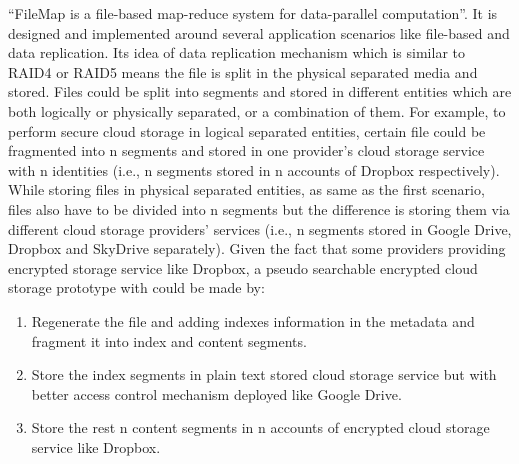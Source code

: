 “FileMap is a file-based map-reduce system for data-parallel computation”\cite{Mfisk2013}. It is designed and implemented around several application scenarios like file-based and data replication. Its idea of data replication mechanism which is similar to RAID4 or RAID5 means the file is split in the physical separated media and stored. Files could be split into segments and stored in different entities which are both logically or physically separated, or a combination of them. For example, to perform secure cloud storage in logical separated entities, certain file could be fragmented into n segments and stored in one provider’s cloud storage service with n identities (i.e., n segments stored in n accounts of Dropbox respectively). While storing files in physical separated entities, as same as the first scenario, files also have to be divided into n segments but the difference is storing them via different cloud storage providers’ services (i.e., n segments stored in Google Drive, Dropbox and SkyDrive separately). Given the fact that some providers providing encrypted storage service like Dropbox, a pseudo searchable encrypted cloud storage prototype with could be made by:
\begin{enumerate}
  \item 
  Regenerate the file and adding indexes information in the metadata and fragment it into index and content segments.
  \item 
  Store the index segments in plain text stored cloud storage service but with better access control mechanism deployed like Google Drive.
  \item
  Store the rest n content segments in n accounts of encrypted cloud storage service like Dropbox.
\end{enumerate}
